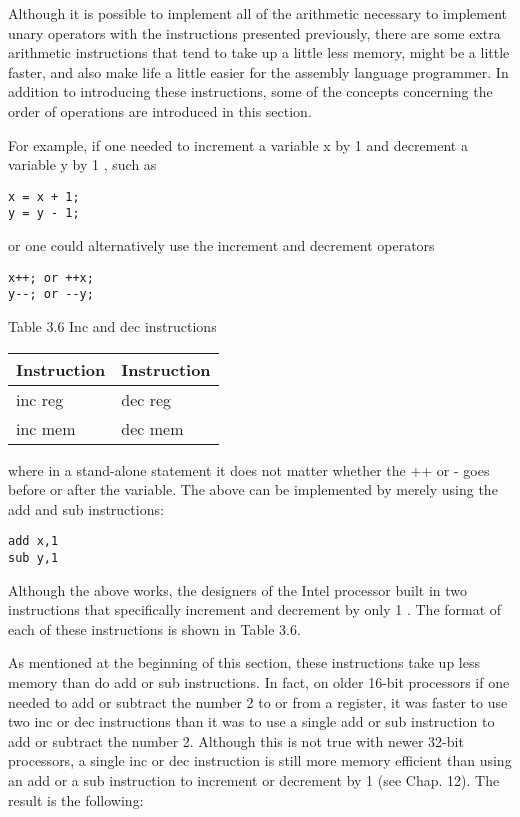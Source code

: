 \documentclass[10pt]{article}
\begin{document}
Although it is possible to implement all of the arithmetic necessary to implement unary operators with the instructions presented previously, there are some extra arithmetic instructions that tend to take up a little less memory, might be a little faster, and also make life a little easier for the assembly language programmer. In addition to introducing these instructions, some of the concepts concerning the order of operations are introduced in this section.

For example, if one needed to increment a variable x by 1 and decrement a variable y by 1 , such as

\begin{verbatim}
x = x + 1;
y = y - 1;
\end{verbatim}

or one could alternatively use the increment and decrement operators

\begin{verbatim}
x++; or ++x;
y--; or --y;
\end{verbatim}

Table 3.6 Inc and dec instructions

\begin{center}
\begin{tabular}{|l|l|}
\hline
Instruction & Instruction \\
\hline
inc reg & dec reg \\
\hline
inc mem & dec mem \\
\hline
\end{tabular}
\end{center}

where in a stand-alone statement it does not matter whether the ++ or - goes before or after the variable. The above can be implemented by merely using the add and sub instructions:

\begin{verbatim}
add x,1
sub y,1
\end{verbatim}

Although the above works, the designers of the Intel processor built in two instructions that specifically increment and decrement by only 1 . The format of each of these instructions is shown in Table 3.6.

As mentioned at the beginning of this section, these instructions take up less memory than do add or sub instructions. In fact, on older 16-bit processors if one needed to add or subtract the number 2 to or from a register, it was faster to use two inc or dec instructions than it was to use a single add or sub instruction to add or subtract the number 2. Although this is not true with newer 32-bit processors, a single inc or dec instruction is still more memory efficient than using an add or a sub instruction to increment or decrement by 1 (see Chap. 12). The result is the following:
\end{document}
